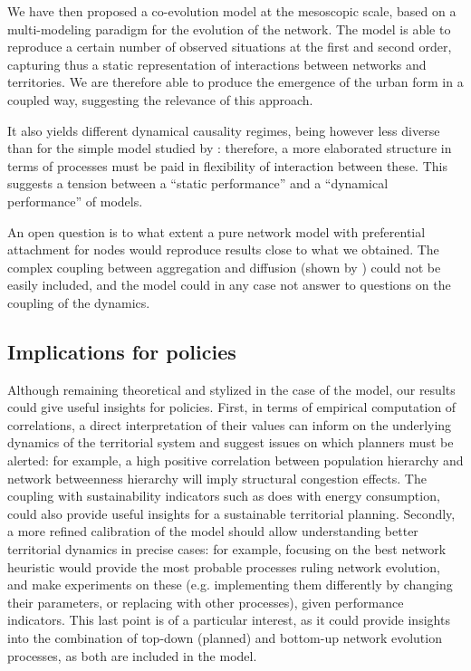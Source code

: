 \documentclass[11pt]{article}
\begin{document}
We have then proposed a co-evolution model at the mesoscopic scale, based on a multi-modeling paradigm for the evolution of the network. The model is able to reproduce a certain number of observed situations at the first and second order, capturing thus a static representation of interactions between networks and territories. We are therefore able to produce the emergence of the urban form in a coupled way, suggesting the relevance of this approach.

It also yields different dynamical causality regimes, being however less diverse than  for the simple model studied by \cite{raimbault2017identification}: therefore, a more elaborated structure in terms of processes must be paid in flexibility of interaction between these. This suggests a tension between a ``static performance'' and a ``dynamical performance'' of models.


An open question is to what extent a pure network model with preferential attachment for nodes would reproduce results close to what we obtained. The complex coupling between aggregation and diffusion (shown by \cite{2017arXiv170806743R}) could not be easily included, and the model could in any case not answer to questions on the coupling of the dynamics.


\subsection{Implications for policies}

Although remaining theoretical and stylized in the case of the model, our results could give useful insights for policies. First, in terms of empirical computation of correlations, a direct interpretation of their values can inform on the underlying dynamics of the territorial system and suggest issues on which planners must be alerted: for example, a high positive correlation between population hierarchy and network betweenness hierarchy will imply structural congestion effects. The coupling with sustainability indicators such as \cite{le2010approche} does with energy consumption, could also provide useful insights for a sustainable territorial planning. Secondly, a more refined calibration of the model should allow understanding better territorial dynamics in precise cases: for example, focusing on the best network heuristic would provide the most probable processes ruling network evolution, and make experiments on these (e.g. implementing them differently by changing their parameters, or replacing with other processes), given performance indicators. This last point is of a particular interest, as it could provide insights into the combination of top-down (planned) and bottom-up network evolution processes, as both are included in the model.
\end{document}
